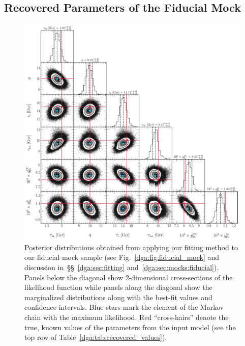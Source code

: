 \subsection{Recovered Parameters of the Fiducial Mock}
\label{dga:sec:mocks:recovered}

\begin{figure}
\centering
\includegraphics[scale = 0.42]{fiducial_512k.pdf}
\caption{
Posterior distributions obtained from applying our fitting method to our
fiducial mock sample (see Fig.~\ref{dga:fig:fiducial_mock} and discussion
in~\S\S~\ref{dga:sec:fitting} and~\ref{dga:sec:mocks:fiducial}).
Panels below the diagonal show 2-dimensional cross-sections of the likelihood
function while panels along the diagonal show the marginalized distributions
along with the best-fit values and confidence intervals.
Blue stars mark the element of the Markov chain with the maximum likelihood.
Red ``cross-hairs'' denote the true, known values of the parameters from the
input model (see the top row of Table~\ref{dga:tab:recovered_values}).
}
\label{dga:fig:fiducial_mock_corner}
\end{figure}

